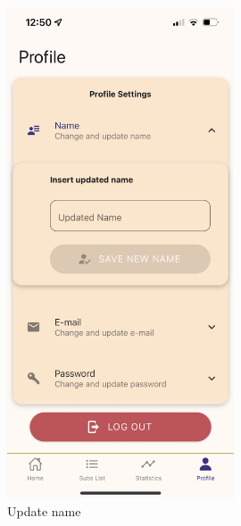 \documentclass[12pt]{article}
\begin{document}
\begin{figure}[h!]
    \centering
    \begin{minipage}[c]{0.45\textwidth}
        \centering
        \includegraphics[width=0.6\textwidth, clip]{../../assets/smartphone/profileNewName.PNG}
        \caption{Update name}
        \label{fig:profileNewName}
    \end{minipage}\hspace{1cm}%
    \begin{minipage}[c]{0.45\textwidth}
        \centering

\end{minipage}
\end{figure}
\end{document}
